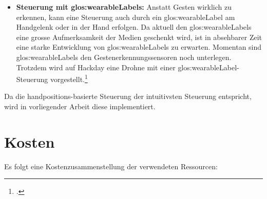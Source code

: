 \begin{itemize}
	\item \textbf{Steuerung mit \glspl{glos:wearableLabel}:}
	Anstatt Gesten wirklich zu erkennen, kann eine Steuerung auch durch ein \gls{glos:wearableLabel} am Handgelenk oder in der Hand erfolgen.
	Da aktuell den \glspl{glos:wearableLabel} eine grosse Aufmerksamkeit der Medien geschenkt wird, ist in absehbarer Zeit eine starke Entwicklung von \glspl{glos:wearableLabel} zu erwarten.
	Momentan sind \glspl{glos:wearableLabel} den Gestenerkennungssensoren noch unterlegen.
	Trotzdem wird auf Hackday eine Drohne mit einer \gls{glos:wearableLabel}-Steuerung vorgestellt.\footcite{Wearable_Gesture_Controlled_Drone_Hackaday_2015-04-29}
\end{itemize}

Da die handpositions-basierte Steuerung der intuitivsten Steuerung entspricht, wird in vorliegender Arbeit diese implementiert.


\section{Kosten}
Es folgt eine Kostenzusammenstellung der verwendeten Ressourcen:

